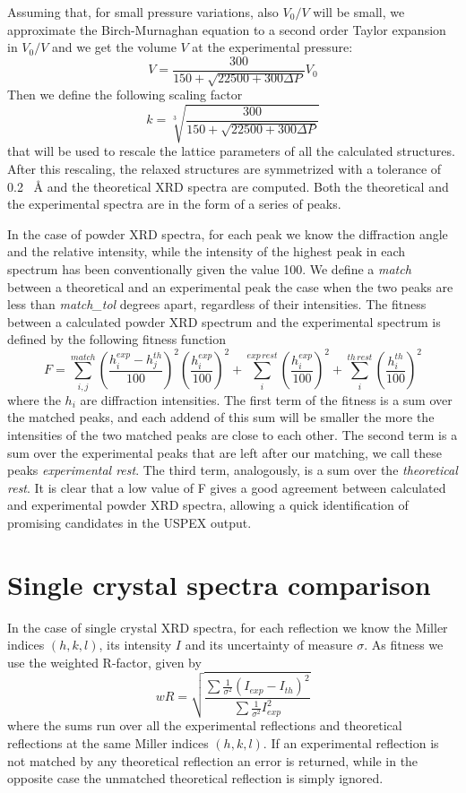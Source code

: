 \documentclass{article}
\begin{document}
Assuming that, for small pressure variations, also $V_0/V$ will be small, we approximate the Birch-Murnaghan equation to a second order Taylor expansion in $V_0/V$ and we get the volume $V$ at the experimental pressure:
\begin{equation*}
	V = \frac{300}{150 + \sqrt{22500 + 300 \Delta P}} V_0
\end{equation*}
Then we define the following scaling factor
\begin{equation*}
	k = \sqrt[3]{\frac{300}{150 + \sqrt{22500 + 300 \Delta P}}}
\end{equation*}
that will be used to rescale the lattice parameters of all the calculated structures. After this rescaling, the relaxed structures are symmetrized with a tolerance of 0.2 \SI{}{\angstrom} and the theoretical XRD spectra are computed. Both the theoretical and the experimental spectra are in the form of a series of peaks.

In the case of powder XRD spectra, for each peak we know the diffraction angle and the relative intensity, while the intensity of the highest peak in each spectrum has been conventionally given the value 100. We define a \emph{match} between a theoretical and an experimental peak the case when the two peaks are less than \emph{match\_tol} degrees apart, regardless of their intensities. The fitness between a calculated powder XRD spectrum and the experimental spectrum is defined by the following fitness function
\begin{equation*}
	F = \sum_{i, j}^{match} \left( \frac{h_i^{exp} - h_j^{th}}{100} \right)^2 \left( \frac{h_i^{exp}}{100} \right)^2 + \sum_i^{exp \, rest} \left( \frac{h_i^{exp}}{100} \right)^2 + \sum_i^{th \, rest} \left( \frac{h_i^{th}}{100} \right)^2
\end{equation*}
where the $h_i$ are diffraction intensities. The first term of the fitness is a sum over the matched peaks, and each addend of this sum will be smaller the more the intensities of the two matched peaks are close to each other. The second term is a sum over the experimental peaks that are left after our matching, we call these peaks \emph{experimental rest}. The third term, analogously, is a sum over the \emph{theoretical rest}. It is clear that a low value of F gives a good agreement between calculated and experimental powder XRD spectra, allowing a quick identification of promising candidates in the USPEX output.

\section{Single crystal spectra comparison}
\label{sec:scspectracomp}

In the case of single crystal XRD spectra, for each reflection we know the Miller indices $(h, k, l)$, its intensity $I$ and its uncertainty of measure $\sigma$. As fitness we use the weighted R-factor, given by
\[
	wR = \sqrt{\frac{\sum \frac{1}{\sigma^2} (I_{exp} - I_{th})^2}{\sum \frac{1}{\sigma^2} I_{exp}^2}}
\]
where the sums run over all the experimental reflections and theoretical reflections at the same Miller indices $(h, k, l)$. If an experimental reflection is not matched by any theoretical reflection an error is returned, while in the opposite case the unmatched theoretical reflection is simply ignored.
\end{document}
